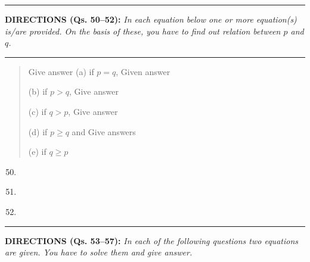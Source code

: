 \begin{multicols}{2}
\noindent
\rule{\columnwidth}{1pt}

\noindent
{\sf\bfseries DIRECTIONS (Qs. 50--52):} {\it In each equation below one or more equation(s) is/are provided. On the basis of these, you have to find out relation between $p$ and $q$.}

\noindent
\rule{\columnwidth}{1pt}

\begin{quote}
Give answer (a) if $p=q$, Given answer

(b) if $p>q$, Give answer

(c) if $q>p$, Give answer

(d) if $p\geq q$ and Give answers

(e) if $q\geq p$
\end{quote}

\begin{enumerate}[leftmargin=*]
\setcounter{enumi}{49}
\item 
\begin{itemize}
\end{itemize}

\item 
\begin{itemize}
\end{itemize}

\item 
\begin{itemize}
\end{itemize}
\end{enumerate}

\noindent
\rule{\columnwidth}{1pt}

\noindent
{\sf\bfseries DIRECTIONS (Qs. 53--57):} {\it In each of the following questions two equations are given. You have to solve them and give answer.}


\end{multicols}
